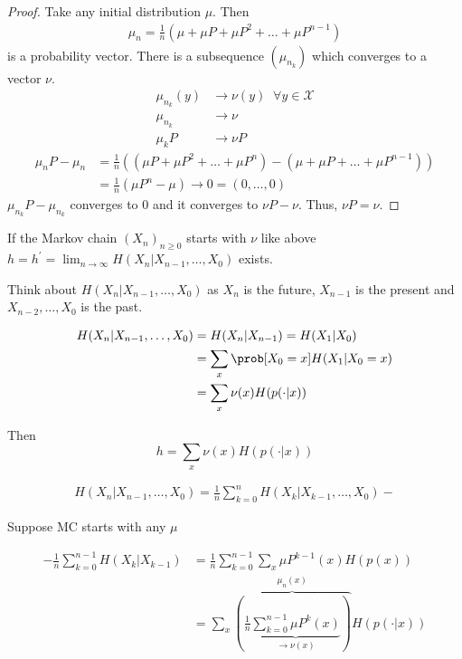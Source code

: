 \documentclass[mfit.tex]{subfiles}
\begin{document}
\begin{proof}
  Take any initial distribution $\mu$.
  Then
  \begin{align*}
    \mu_n = \frac{1}{n} (\mu + \mu P + \mu P^2 + \dots + \mu P^{n-1})
  \end{align*}
  is a probability vector.
  There is a subsequence $(\mu_{n_k})$ which converges to a vector $\nu$.
  \begin{align*}
    \mu_{n_k}(y) &\to \nu(y) \;\; \forall y \in \mathcal{X} \\
    \mu_{n_k} &\to \nu \\
    \mu_k P &\to \nu P
  \end{align*}
  \begin{align*}
    \mu_n P - \mu_n &= \frac{1}{n} ((\mu P + \mu P^2 + \dots + \mu P^n) - (\mu + \mu P + \dots + \mu P^{n-1})) \\
    &= \frac{1}{n} (\mu P^n - \mu) \to 0 = (0,\dots,0)
  \end{align*}
  $\mu_{n_k} P - \mu_{n_k}$ converges to $0$ and it converges to $\nu P - \nu$. Thus, $\nu P = \nu$.
\end{proof}

\begin{cor}
  If the Markov chain $(X_n)_{n \geq 0}$ starts with $\nu$ like above $h = h^\prime = \lim_{n \to \infty} H(X_n|X_{n-1},\dots,X_0)$ exists.
\end{cor}

Think about $H(X_n|X_{n-1},\dots,X_0)$ as $X_n$ is the future, $X_{n-1}$ is the present and $X_{n-2},\dots,X_0$ is the past.

\begin{align*}
  H(X_n|X_{n-1},\dots,X_0) &= H(X_n|X_{n-1}) = H(X_1|X_0) \\
  &= \sum_x \prob[X_0 = x] H(X_1|X_0 = x) \\
  &= \sum_x \nu(x) H(p(\cdot|x))
\end{align*}

Then 
\[ h = \sum_x \nu(x) H(p(\cdot|x)) \]


\begin{align*}
  H(X_n|X_{n-1},\dots,X_0) = \frac{1}{n} \sum_{k=0}^n H(X_k|X_{k-1},\dots,X_0) -
\end{align*}

Suppose MC starts with any $\mu$

\begin{align*}
  -\frac{1}{n} \sum_{k=0}^{n-1} H(X_k|X_{k-1}) &= \frac{1}{n} \sum_{k=0}^{n-1} \sum_x \mu P^{k-1}(x) H(p(x)) \\
  &= \sum_x \overbrace{(\frac{1}{n} \underbrace{\sum_{k=0}^{n-1} \mu P^{k}(x)}_{\to \nu(x)})}^{\mu_n(x)} H(p(\cdot|x))
\end{align*}
\end{document}
